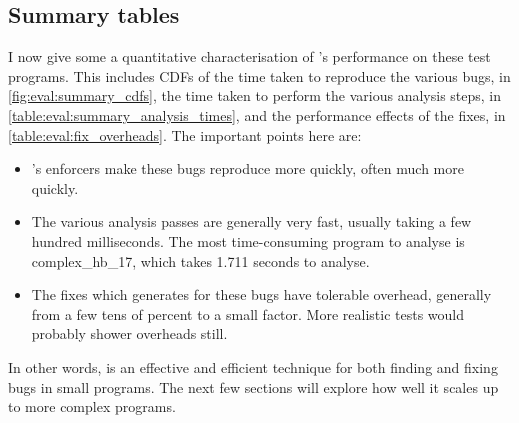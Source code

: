 \subsection{Summary tables}

I now give some a quantitative characterisation of {\technique}'s
performance on these test programs.  This includes CDFs of the time
taken to reproduce the various bugs, in
\autoref{fig:eval:summary_cdfs}, the time taken to perform the various
analysis steps, in \autoref{table:eval:summary_analysis_times}, and
the performance effects of the fixes, in
\autoref{table:eval:fix_overheads}.  The important points here are:

\begin{itemize}
\item {\Technique}'s enforcers make these bugs reproduce more quickly,
  often much more quickly.
\item The various analysis passes are generally very fast, usually
  taking a few hundred milliseconds.  The most time-consuming program
  to analyse is complex\_hb\_17, which takes 1.711 seconds to analyse.
\item The fixes which {\technique} generates for these bugs have
  tolerable overhead, generally from a few tens of percent to a small
  factor.  More realistic tests would probably shower overheads still.
\end{itemize}

In other words, {\technique} is an effective and efficient technique
for both finding and fixing bugs in small programs.  The next few
sections will explore how well it scales up to more complex programs.



